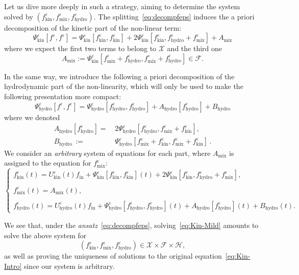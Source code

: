 \documentclass[10pt]{amsart}
\theoremstyle{definition}\newtheorem{defi}[theo]{Definition}\newtheorem{rema}[theo]{Remark}\newtheorem{exam}[theo]{Example}\newtheorem{exem}[theo]{Example}\newtheorem{nota}[theo]{Notation}
\newcommand{\ini}{\mathrm{in}}
\newcommand{\hyd}{\mathrm{hydro}}
\newcommand{\mix}{\mathrm{mix}}
\newcommand{\kin}{\mathrm{kin}}
\newcommand{\FFF}{\mathscr{F}}
\newcommand{\HHH}{\mathscr{H}}
\newcommand{\GGG}{\mathscr{X}}
\newcommand{\SSSs}{\HHH}
\newcommand{\SSSl}{\GGG}
\newcommand{\SSSm}{\FFF}
\newcommand*\eps{{\varepsilon}}
\begin{document}
Let us dive more deeply in such a strategy, aiming to determine the system solved by $(f^\eps_\kin,f^\eps_\mix,f^\eps_\hyd)$. The splitting~\eqref{eq:decompfeps} induces the a priori decomposition of the kinetic part of the non-linear term:
\[
\Psi^\eps_\kin\left[f^\eps, f^\eps\right] = \Psi^\eps_\kin \left[f^\eps_\kin, f^\eps_\kin \right] + 2 \Psi^\eps_\kin \left[f^\eps_\kin, f^\eps_\hyd + f^\eps_\mix\right] + A_\mix
\]
where we expect the first two terms to belong to $\SSSl$ and the third one
\[
A_\mix:=\Psi^\eps_\kin \left[f^\eps_\mix + f^\eps_\hyd, f^\eps_\mix + f^\eps_\hyd \right] \in \SSSm.
\]


In the same way, we introduce the following a priori decomposition of the hydrodynamic part of the non-linearity, which will only be used to make the following presentation more compact:
\[
\Psi^\eps_\hyd\left[f^\eps, f^\eps\right]=\Psi^\eps_\hyd \left[f^\eps_\hyd, f^\eps_\hyd\right] + A_\hyd\left[f^\eps_\hyd\right] + B_\hyd
\]
where we denoted
\begin{align*}
A_\hyd\left[f^\eps_\hyd\right] =&\, 2 \Psi^\eps_\hyd\left[f^\eps_\hyd, f^\eps_\mix + f^\eps_\kin\right], \\
 B_\hyd\,{:=}&\, \Psi^\eps_\hyd \left[f^\eps_\mix + f^\eps_\kin, f^\eps_\mix + f^\eps_\kin \right]\,.
\end{align*}
We consider an \emph{arbitrary} system of equations for each part, where $A_\mix$ is assigned to the equation for $f^\eps_\mix$:
\begin{equation*}\label{eq:systemE}
\begin{cases}
f^\eps_\kin(t) = U^\eps_\kin(t) f_\ini + \Psi^\eps_\kin \left[f^\eps_\kin, f^\eps_\kin \right](t) + 2 \Psi^\eps_\kin \left[f^\eps_\kin, f^\eps_\hyd + f^\eps_\mix\right],\\
\\
f^\eps_\mix(t) = A_\mix(t),\\
\\
f^\eps_\hyd(t) = U^\eps_\hyd(t) f_\ini + \Psi^\eps_\hyd\left[f^\eps_\hyd, f^\eps_\hyd\right](t) + A_\hyd\left[f^\eps_\hyd\right](t) + B_\hyd(t).
\end{cases}
\end{equation*}

We see that, under the \emph{ansatz}~\eqref{eq:decompfeps}, solving~\eqref{eq:Kin-Mild} amounts to solve the above system for
\[
\left(f^\eps_\kin,f^\eps_\mix,f^\eps_\hyd\right) \in \SSSl\times \SSSm\times \SSSs,
\]
as well as proving the uniqueness of solutions to the original equation~\eqref{eq:Kin-Intro} since our system is arbitrary.
\end{document}
